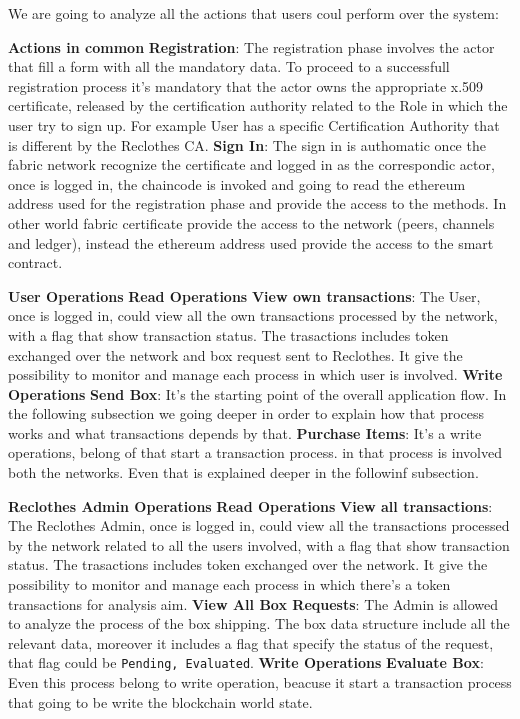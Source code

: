 We are going to analyze all the actions that users coul perform over the system:
\begin{outline}
    \1 \textbf{Actions in common}
    \2 \textbf{Registration}: The registration phase involves the actor that fill a form with all the 
    mandatory data. To proceed to a successfull registration process it's mandatory that the actor
    owns the appropriate x.509 certificate, released by the certification authority related to the Role
    in which the user try to sign up. For example User has a specific Certification Authority that is
    different by the Reclothes CA. 
    \2 \textbf{Sign In}: The sign in is authomatic once the fabric network recognize the certificate and 
    logged in as the correspondic actor, once is logged in, the chaincode is invoked and going to read the 
    ethereum address used for the registration phase and provide the access to the methods.
    In other world fabric certificate provide the access to the network (peers, channels and ledger),
    instead the ethereum address used provide the access to the smart contract. 
    
    \1 \textbf{User Operations}
    \2 \textbf{Read Operations}
    \3 \textbf{View own transactions}: The User, once is logged in, could view all the own transactions
    processed by the network, with a flag that show transaction status. The trasactions includes token 
    exchanged over the network and box request sent to Reclothes. It give the possibility to 
    monitor and manage each process in which user is involved. 
    \2 \textbf{Write Operations}
    \3 \textbf{Send Box}: It's the starting point of the overall application flow. In the following subsection
    we going deeper in order to explain how that process works and what transactions depends by that.
    \3 \textbf{Purchase Items}: It's a write operations, belong of that start a transaction process. in that
    process is involved both the networks. Even that is explained deeper in the followinf subsection.

    \1 \textbf{Reclothes Admin Operations}
    \2 \textbf{Read Operations}
    \3 \textbf{View all transactions}: The Reclothes Admin, once is logged in, could view all the transactions
    processed by the network related to all the users involved, with a flag that show transaction status. The trasactions includes token 
    exchanged over the network. It give the possibility to monitor and manage each process in which there's a token transactions
    for analysis aim.
    \3 \textbf{View All Box Requests}: The Admin is allowed to analyze the process of the box shipping.
    The box data structure include all the relevant data, moreover it includes a flag that specify the status
    of the request, that flag could be \texttt{Pending, Evaluated}. 
    \2 \textbf{Write Operations}
    \3 \textbf{Evaluate Box}: Even this process belong to write operation, beacuse it start a transaction
    process that going to be write the blockchain world state. 

\end{outline}


